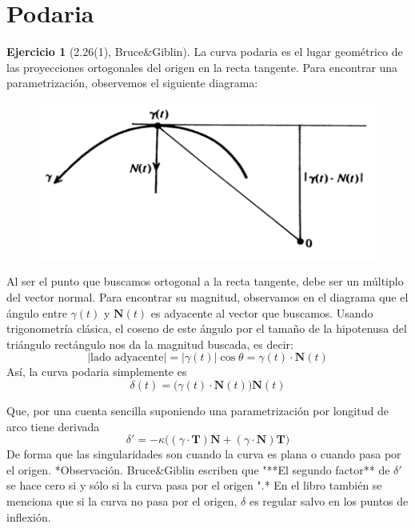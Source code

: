 \documentclass[spanish]{book}
\theoremstyle{definition}
\newtheorem*{ejer}{Ejercicio}
\begin{document}
\section{Podaria}
\begin{ejer}[2.26(1), Bruce\&Giblin]
	La curva podaria es el lugar geométrico de las proyecciones ortogonales del origen en la recta tangente. Para encontrar una parametrización, observemos el siguiente diagrama:
	\begin{figure}[H]
		\centering
		\includegraphics[width=0.7\linewidth]{curvas8}
	\end{figure}
	Al ser el punto que buscamos ortogonal a la recta tangente, debe ser un múltiplo del vector normal. Para encontrar su magnitud, observamos en el diagrama que el ángulo entre $\gamma (t)$ y $\mathbf{N}(t)$ es adyacente al vector que buscamos. Usando trigonometría clásica, el coseno de este ángulo por el tamaño de la hipotenusa del triángulo rectángulo nos da la magnitud buscada, es decir:
	\[|\text{lado adyacente}|=|\gamma(t)|\cos{\theta}=\gamma(t)\cdot\mathbf{N}(t)\]
	Así, la curva podaria simplemente es
	\[\delta(t)=\big(\gamma(t)\cdot\mathbf{N}(t)\big)\mathbf{N}(t)\]
	
	Que, por una cuenta sencilla suponiendo una parametrización por longitud de arco tiene derivada
	\[\delta'=-\kappa\Big((\gamma\cdot\mathbf{T})\mathbf{N}+(\gamma\cdot\mathbf{N})\mathbf{T}\Big)\]
	De forma que las singularidades son cuando la curva es plana o cuando pasa por el origen. *Observación. Bruce\&Giblin escriben que "**El segundo factor** de $\delta'$ se hace cero si y sólo si la curva pasa por el origen ".* En el libro también se menciona que si la curva no pasa por el origen, $\delta$ es regular salvo en los puntos de inflexión.
\end{ejer}
\end{document}
